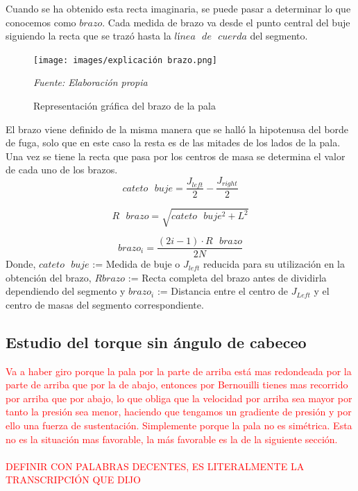 Cuando se ha obtenido esta recta imaginaria, se puede pasar a determinar lo que conocemos como $brazo$. Cada medida de brazo va desde el punto central del buje siguiendo la recta que se trazó hasta la $línea \text{ } de \text{ } cuerda$ del segmento.


    \begin{figure}[H]
    \centering
    \texttt{[image: images/explicación brazo.png]}
    \caption{Representación gráfica del brazo de la pala}
    \label{fig:exp_brazo}
    \textit{Fuente: Elaboración propia}
\end{figure}

\begin{definicion}
El brazo viene definido de la misma manera que se halló la hipotenusa del borde de fuga, solo que en este caso la resta es de las mitades de los lados de la pala. Una vez se tiene la recta que pasa por los centros de masa se determina el valor de cada uno de los brazos.
$$ cateto \text{ } buje = \dfrac{J_{left}}{2} - \dfrac{J_{right}}{2} $$

$$ R \text{ } brazo = \sqrt{cateto \text{ } buje^{2} + L^{2}}$$

$$ brazo_i = \dfrac{(2i -1) \cdot R \text{ } brazo}{2N} $$
Donde, $cateto \text{ } buje$ := Medida de buje o $J_{left}$ reducida para su utilización en la obtención del brazo, $R brazo$ := Recta completa del brazo antes de dividirla dependiendo del segmento y \hspace{10pt} $brazo_i$ := Distancia entre el centro de $J_{Left}$ y el centro de masas del segmento correspondiente.
\centering 
\label{def:brazo}
\end{definicion}

\subsection{Estudio del torque sin ángulo de cabeceo}
\label{section:torque_pala_horizontal}

\textcolor{red}{Va a haber giro porque la pala por la parte de arriba está mas redondeada por la parte de arriba que por la de abajo, entonces por Bernouilli tienes mas recorrido por arriba  que por abajo, lo que obliga que la velocidad por arriba sea mayor por tanto la presión sea menor, haciendo que tengamos un gradiente de presión y por ello una fuerza de sustentación. Simplemente porque la pala no es simétrica. Esta no es la situación mas favorable, la más favorable es la de la siguiente sección. \\\\
{\Large DEFINIR CON PALABRAS DECENTES, ES LITERALMENTE LA TRANSCRIPCIÓN QUE DIJO}}





















